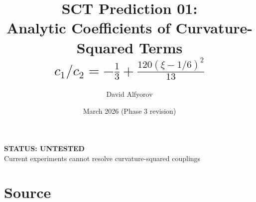 \documentclass[11pt,a4paper]{article}
\title{%
  \textbf{SCT Prediction 01:}\\[6pt]
  \Large Analytic Coefficients of Curvature-Squared Terms\\[4pt]
  \large $c_1/c_2 = -\tfrac{1}{3} + \tfrac{120(\xi - 1/6)^2}{13}$
}
\author{David Alfyorov}
\date{March 2026 (Phase 3 revision)}
\begin{document}
\maketitle


\begin{center}
\end{center}

\begin{center}
  \colorbox{untested!15}{\parbox{0.6\textwidth}{\centering
    \textbf{\color{untested} STATUS: UNTESTED}\\[2pt]
    \small Current experiments cannot resolve curvature-squared couplings
  }}
\end{center}

\vspace{1em}

\section{Source}
\end{document}
